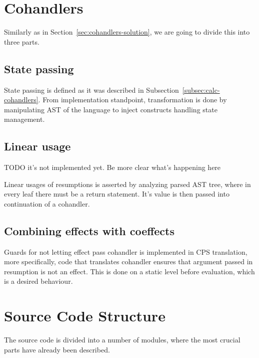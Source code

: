 \documentclass[declaration,shortabstract]{iithesis}
\theoremstyle{definition} \newtheorem{definition}{Definition}[chapter]
\theoremstyle{remark} \newtheorem{remark}[definition]{Observation}
\theoremstyle{plain} \newtheorem{theorem}[definition]{Theorem}
\theoremstyle{plain} \newtheorem{lemma}[definition]{Lemma}
\begin{document}
    \section{Cohandlers}

    Similarly as in Section~\ref{sec:cohandlers-solution}, we are going to
    divide this into three parts.

    \subsection{State passing}

    State passing is defined as it was described in
    Subsection~\ref{subsec:calc-cohandlers}.
    From implementation standpoint, transformation is done by manipulating
    AST of the language to inject constructs handling state management.

    \subsection{Linear usage}

    TODO it's not implemented yet. Be more clear what's happening here

    Linear usages of resumptions is asserted by analyzing parsed AST tree,
    where in every leaf there must be a return statement. It's value is then
    passed into continuation of a cohandler.

    \subsection{Combining effects with coeffects}

    Guards for not letting effect pass cohandler is implemented in CPS
    translation, more specifically, code that translates cohandler ensures that
    argument passed in resumption is not an effect. This is done on a static
    level before evaluation, which is a desired behaviour.

    \section{Source Code Structure}

    The source code is divided into a number of modules, where the most
    crucial parts have already been described.
\end{document}
